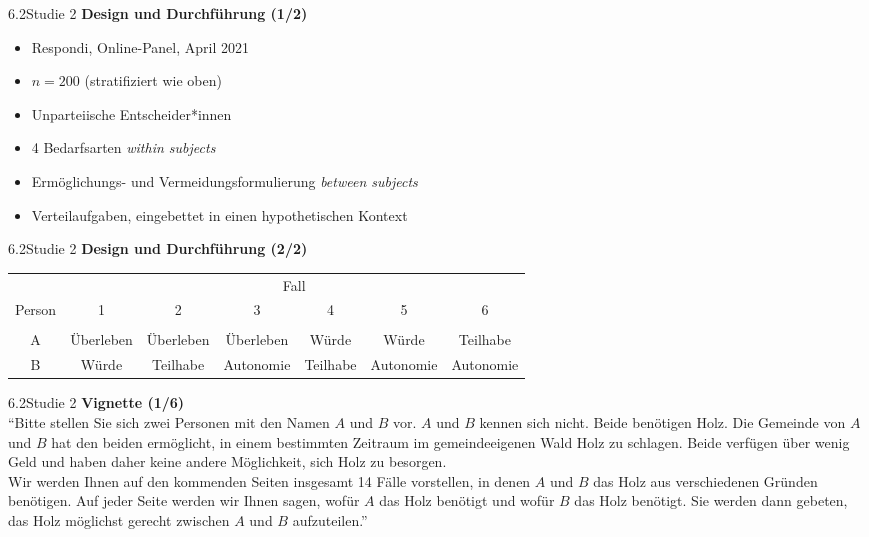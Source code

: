 \documentclass[xcolor=table,9pt,aspectratio=169]{beamer}
\begin{document}
\begin{frame}{\vspace*{10mm}6.2\hspace*{1em}Studie 2}
\textbf{Design und Durchführung (1/2)}\\
\begin{itemize}
   \item Respondi, Online-Panel, April 2021
   \item $n=200$ (stratifiziert wie oben)
   \item Unparteiische Entscheider*innen
   \item 4 Bedarfsarten \textit{within subjects}
   \item Ermöglichungs- und Vermeidungsformulierung \textit{between subjects}
   \item Verteilaufgaben, eingebettet in einen hypothetischen Kontext
\end{itemize}
\end{frame}


\begin{frame}{\vspace*{10mm}6.2\hspace*{1em}Studie 2}
\textbf{Design und Durchführung (2/2)}\\
\medskip
\begin{tabular}{ccccccc}
   \arrayrulecolor{blue2}
   \hline
            & \multicolumn{6}{c}{Fall}                                                         \\
   Person   & 1           & 2           & 3           & 4          & 5           & 6           \\
   \hline\hline\\[-0.5em]
   A        & Überleben   & Überleben   & Überleben   & Würde      & Würde       & Teilhabe    \\
   B        & Würde       & Teilhabe    & Autonomie   & Teilhabe   & Autonomie   & Autonomie   \\
   \hline
\end{tabular}
\end{frame}


\begin{frame}{\vspace*{10mm}6.2\hspace*{1em}Studie 2}
\textbf{Vignette (1/6)}\\
\medskip
\enquote{Bitte stellen Sie sich zwei Personen mit den Namen $A$ und $B$ vor. $A$ und $B$ kennen sich nicht. Beide benötigen Holz. Die Gemeinde von $A$ und $B$ hat den beiden ermöglicht, in einem bestimmten Zeitraum im gemeindeeigenen Wald Holz zu schlagen. Beide verfügen über wenig Geld und haben daher keine andere Möglichkeit, sich Holz zu besorgen.\\
\medskip
Wir werden Ihnen auf den kommenden Seiten insgesamt 14 Fälle vorstellen, in denen $A$ und $B$ das Holz aus verschiedenen Gründen benötigen. Auf jeder Seite werden wir Ihnen sagen, wofür $A$ das Holz benötigt und wofür $B$ das Holz benötigt. Sie werden dann gebeten, das Holz möglichst gerecht zwischen $A$ und $B$ aufzuteilen.}
\end{frame}
\end{document}
